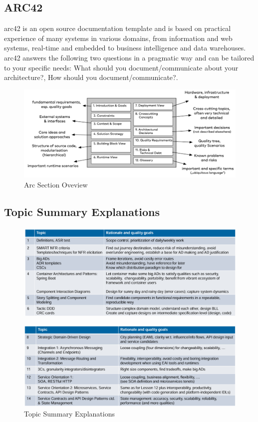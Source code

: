 \documentclass[../Main.tex]{subfiles}
\begin{document}
\newpage
\subsection{ARC42}
arc42 is an open source documentation template and is based on practical experience of many systems in various
domains, from information and web systems, real-time and embedded to business intelligence and data warehouses.
arc42 answers the following two questions in a pragmatic way and can be tailored to your specific needs: What should
you document/communicate about your architecture?, How should you document/communicate?.

\begin{figure}[H]
    \centering
    \includegraphics[width=0.75\linewidth]{Images/arc-section-overview.png}
    \caption{Arc Section Oveview}
\end{figure}
\newpage

\subsection{Topic Summary Explanations}
\begin{figure}[H]
    \centering
    \includegraphics[width=1\linewidth]{Images/topic-summary-explanation.png}
\end{figure}
\begin{figure}[H]
    \centering
    \includegraphics[width=1\linewidth]{Images/topic-summary-explanation-1.png}
    \caption{Topic Summary Explanations}
\end{figure}
\end{document}
